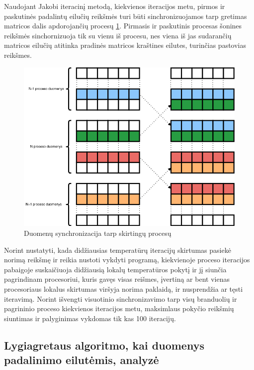 \documentclass{VUMIFPSbakalaurinis}
\begin{document}
Naudojant Jakobi iteracinį metodą, kiekvienos iteracijos metu, pirmos ir paskutinės padalintų eilučių reikšmės turi būti sinchronizuojamos tarp gretimas matricos dalis apdorojančių procesų \ref{img:sync}. 
Pirmasis ir paskutinis procesas šonines reikšmės sinchornizuoja tik su vienu iš procesu, nes viena iš jas sudarančių matricos eilučių atitinka pradinės matricos kraštines eilutes, turinčias pastovias reikšmes.

\begin{figure}[H]
    \centering
    \includegraphics[scale=0.5]{img/sync.png}
    \caption{Duomenų synchronizacija tarp skirtingų procesų}
    \label{img:sync}
\end{figure}

Norint nustatyti, kada didžiausias temperatūrų iteracijų skirtumas pasiekė norimą reikšmę ir reikia nustoti vykdyti programą, kiekvienoje proceso iteracijos pabaigoje suskaičiuoja didžiausią lokalų temperatūros pokytį ir jį siunčia pagrindinam procesoriui, 
kuris gavęs visas reišmes, įvertiną ar bent vienas procesoriaus lokalus skirtumas viršyja norima paklaidą, ir nusprendžia ar tęsti iteravimą.
Norint išvengti visuotinio sinchronizavimo tarp visų branduolių ir pagrininio proceso kiekvienos iteracijos metu, maksimlaus pokyčio reikšmių siuntimas ir palyginimas vykdomas tik kas 100 iteracijų.

\subsection{Lygiagretaus algoritmo, kai duomenys padalinimo eilutėmis, analyzė}
\end{document}

